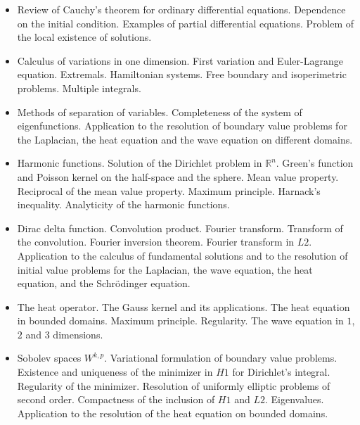\documentclass[spanish]{article}
\newcommand{\RR}{\mathbb{R}}
\begin{document}
\begin{itemize}
  \item
Review of Cauchy's theorem for ordinary differential equations. Dependence on the initial condition. Examples of partial differential equations. Problem of the local existence of solutions.

  \item
Calculus of variations in one dimension. First variation and Euler-Lagrange equation. Extremals. Hamiltonian systems. Free boundary and isoperimetric problems. Multiple integrals.

  \item
Methods of separation of variables. Completeness of the system of eigenfunctions. Application to the resolution of boundary value problems for the Laplacian, the heat equation and the wave equation on different domains.

  \item
Harmonic functions. Solution of the Dirichlet problem in $\RR^n$. Green's function and Poisson kernel on the half-space and the sphere. Mean value property. Reciprocal of the mean value property. Maximum principle. Harnack's inequality. Analyticity of the harmonic functions.

  \item
Dirac delta function. Convolution product. Fourier transform. Transform of the convolution. Fourier inversion theorem. Fourier transform in $L2$. Application to the calculus of fundamental solutions and to the resolution of initial value problems for the Laplacian, the wave equation, the heat equation, and the Schrödinger equation.

  \item
The heat operator. The Gauss kernel and its applications. The heat equation in bounded domains. Maximum principle. Regularity. The wave equation in $1$, $2$ and $3$ dimensions.

  \item
    Sobolev spaces $W^{k,p}$. Variational formulation of boundary value problems. Existence and uniqueness of the minimizer in $H1$ for Dirichlet's integral. Regularity of the minimizer. Resolution of uniformly elliptic problems of second order. Compactness of the inclusion of $H1$ and $L2$. Eigenvalues. Application to the resolution of the heat equation on bounded domains.

\end{itemize}
\end{document}
